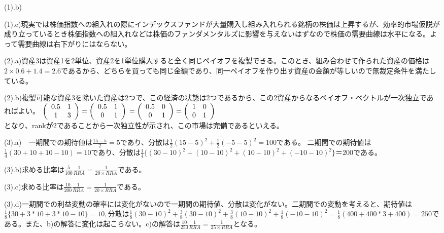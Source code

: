 \documentclass[11pt]{jsarticle}
\begin{document}
    \par(1).b)
    \par(1).c)現実では株価指数への組入れの際にインデックスファンドが大量購入し組み入れられる銘柄の株価は上昇するが、効率的市場仮説が成り立っているとき株価指数への組入れなどは株価のファンダメンタルズに影響を与えないはずなので株価の需要曲線は水平になる。よって需要曲線は右下がりにはならない。
    \par(2).a)資産3は資産1を2単位、資産2を1単位購入すると全く同じペイオフを複製できる。このとき、組み合わせて作られた資産の価格は$2 \times 0.6 + 1.4 = 2.6$であるから、どちらを買っても同じ金額であり、同一ペイオフを作り出す資産の金額が等しいので無裁定条件を満たしている。
    \par(2).b)複製可能な資産3を除いた資産は2つで、この経済の状態は2つであるから、この2資産からなるペイオフ・ベクトルが一次独立であればよい。
    $
    \left(
    \begin{array}{cc}
        0.5 & 1 \\
        1   & 3
    \end{array}
    \right)
    = \left(\begin{array}{cc}
                0.5 & 1 \\
                0   & 1
    \end{array}
    \right)\\
    = \left(
    \begin{array}{cc}
        0.5 & 0 \\
        0   & 1
    \end{array}
    \right)
    = \left(
    \begin{array}{cc}
        1 & 0 \\
        0 & 1
    \end{array}
    \right)
    $\\
    となり、rankが2であることから一次独立性が示され、この市場は完備であるといえる。
    \par(3).a)　一期間での期待値は$\frac{15 - 5}{2} = 5$であり、分散は$\frac{1}{2}(15 - 5)^2 + \frac{1}{2}(-5 - 5)^2 = 100$である。
二期間での期待値は$\frac{1}{4}(30 + 10 + 10 - 10) = 10$であり、分散は$\frac{1}{4}\{(30 - 10)^2 + (10 - 10)^2 + (10 - 10)^2 + (-10 - 10)^2\}　＝200$である。
\par(3).b)求める比率は$\frac{5}{100}\frac{1}{RRA} = \frac{1}{20 \times RRA}$である。
\par(3).c)求める比率は$\frac{10}{200}\frac{1}{RRA} = \frac{1}{20 \times RRA}$である。
\par(3).d)一期間での利益変動の確率には変化がないので一期間の期待値、分散は変化がない。二期間での変動を考えると、期待値は$\frac{1}{8}\{30 + 3 * 10 + 3 * 10 - 10\} = 10,分散は\frac{1}{8}(30 - 10)^2 + \frac{3}{8}(30 - 10)^2
+ \frac{3}{8}(10 - 10)^2 + \frac{1}{8}(-10 - 10)^2 = \frac{1}{8}(400 + 400 * 3 + 400) = 250$である。また、b)の解答に変化は起こらない。c)の解答は$\frac{10}{250}\frac{1}{RRA} = \frac{1}{25 \times RRA}$となる。
\par
\end{document}
